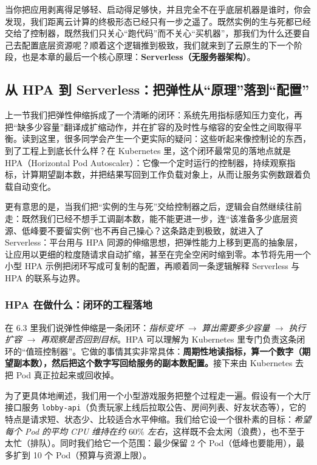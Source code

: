 当你把应用剥离得足够轻、启动得足够快，并且完全不在乎底层机器是谁时，你会发现，我们距离云计算的终极形态已经只有一步之遥了。既然实例的生与死都已经交给了控制器，既然我们只关心“跑代码”而不关心“买机器”，那我们为什么还要自己去配置底层资源呢？顺着这个逻辑推到极致，我们就来到了云原生的下一个阶段，也是本章的最后一个核心原理：\textbf{Serverless（无服务器架构）}。

\subsection{ 从 HPA 到 Serverless：把弹性从“原理”落到“配置”}
上一节我们把弹性伸缩拆成了一个清晰的闭环：系统先用指标感知压力变化，再把“缺多少容量”翻译成扩缩动作，并在扩容的及时性与缩容的安全性之间取得平衡。读到这里，很多同学会产生一个更实际的疑问：这些听起来像控制论的东西，到了工程上到底长什么样？在 Kubernetes 里，这个闭环最常见的落地点就是 HPA（Horizontal Pod Autoscaler）：它像一个定时运行的控制器，持续观察指标，计算期望副本数，并把结果写回到工作负载对象上，从而让服务实例数跟着负载自动变化。

更有意思的是，当我们把“实例的生与死”交给控制器之后，逻辑会自然继续往前走：既然我们已经不想手工调副本数，能不能更进一步，连“该准备多少底层资源、低峰要不要留实例”也不再自己操心？这条路走到极致，就进入了 Serverless：平台用与 HPA 同源的伸缩思想，把弹性能力上移到更高的抽象层，让应用以更细的粒度随请求自动扩缩，甚至在完全空闲时缩到零。本节将先用一个小型 HPA 示例把闭环写成可复制的配置，再顺着同一条逻辑解释 Serverless 与 HPA 的联系与边界。

\subsubsection{HPA 在做什么：闭环的工程落地}
在 6.3 里我们说弹性伸缩是一条闭环：\emph{指标变坏} $\rightarrow$ \emph{算出需要多少容量} $\rightarrow$ \emph{执行扩容} $\rightarrow$ \emph{再观察是否回到目标}。HPA 可以理解为 Kubernetes 里专门负责这条闭环的“值班控制器”。它做的事情其实非常具体：\textbf{周期性地读指标，算一个数字（期望副本数），然后把这个数字写回给服务的副本数配置。}接下来由 Kubernetes 去把 Pod 真正拉起来或回收掉。

为了更具体地阐述，我们用一个小型游戏服务把整个过程走一遍。假设有一个大厅接口服务 \texttt{lobby-api}（负责玩家上线后拉取公告、房间列表、好友状态等），它的特点是请求短、状态少、比较适合水平伸缩。我们给它设一个很朴素的目标：\emph{希望每个 Pod 的平均 CPU 维持在约 $60\%$ 左右}，这样既不会太闲（浪费），也不至于太忙（排队）。同时我们给它一个范围：最少保留 2 个 Pod（低峰也要能用），最多扩到 10 个 Pod（预算与资源上限）。

